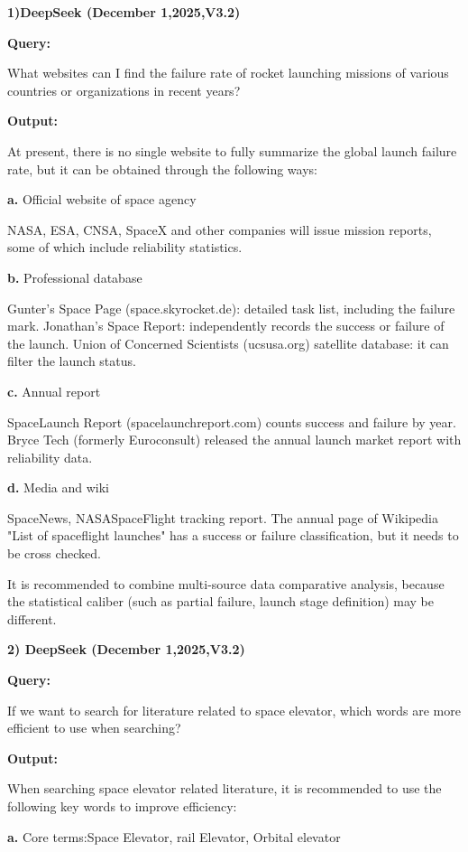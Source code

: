 \documentclass{article}
\begin{document}
\textbf{1)DeepSeek (December 1,2025,V3.2)}

\textbf{Query: }

What websites can I find the failure rate of rocket launching missions of various countries or organizations in recent years?

\textbf{Output:}

At present, there is no single website to fully summarize the global launch failure rate, but it can be obtained through the following ways:

\textbf{a.}	Official website of space agency

NASA, ESA, CNSA, SpaceX and other companies will issue mission reports, some of which include reliability statistics.

\textbf{b.}	Professional database

Gunter's Space Page (space.skyrocket.de): detailed task list, including the failure mark.
Jonathan's Space Report: independently records the success or failure of the launch.
Union of Concerned Scientists (ucsusa.org) satellite database: it can filter the launch status.

\textbf{c.}	Annual report

SpaceLaunch Report (spacelaunchreport.com) counts success and failure by year.
Bryce Tech (formerly Euroconsult) released the annual launch market report with reliability data.

\textbf{d.}	Media and wiki

SpaceNews, NASASpaceFlight tracking report.
The annual page of Wikipedia "List of spaceflight launches" has a success or failure classification, but it needs to be cross checked.

It is recommended to combine multi-source data comparative analysis, because the statistical caliber (such as partial failure, launch stage definition) may be different.


\textbf{2)	DeepSeek (December 1,2025,V3.2)}

\textbf{Query:}

If we want to search for literature related to space elevator, which words are more efficient to use when searching?

\textbf{Output:}

When searching space elevator related literature, it is recommended to use the following key words to improve efficiency:

\textbf{a.}	Core terms:Space Elevator, rail Elevator, Orbital elevator
\end{document}
